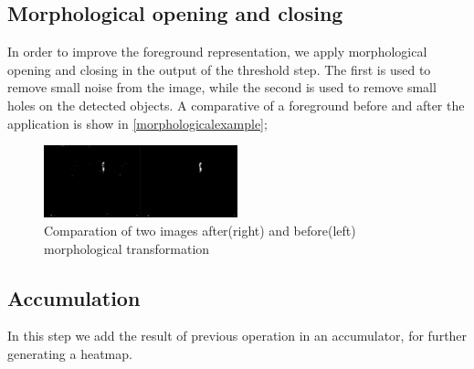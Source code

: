 \documentclass[10pt, conference]{IEEEtran}
\begin{document}
	\subsection{Morphological opening and closing}
	In order to improve the foreground representation, we apply morphological opening and closing\cite{haralick1987image} in the output of the threshold step. The first is used to remove small noise from the image, while the second is used to remove small holes on the detected objects. A comparative of a foreground before and after the application is show in \autoref{morphologicalexample};
	\begin{figure}[H]
		\centering
		\includegraphics[width=0.5\textwidth]{figs/morphological}
		\caption{Comparation of two images after(right) and before(left) morphological transformation}
		\label{morphologicalexample}
	\end{figure}
	
	\subsection{Accumulation}
	In this step we add the result of previous operation in an accumulator, for further generating a heatmap.
	
\end{document}
